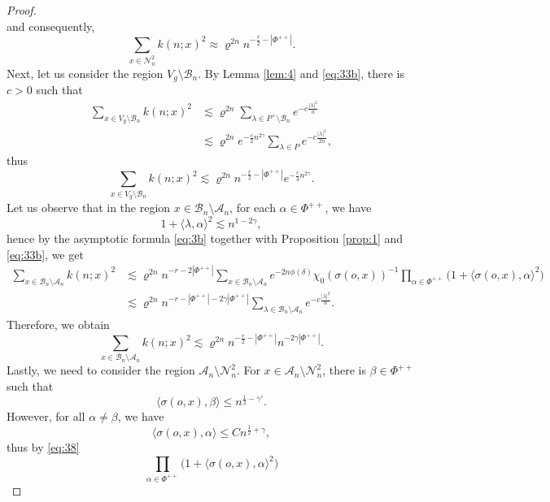 \documentclass[10pt,a4paper]{amsart}
\newcommand{\calA}{\mathcal{A}}
\newcommand{\calB}{\mathcal{B}}
\newcommand{\scrA}{\mathscr{A}}
\newcommand{\scrB}{\mathscr{B}}
\newcommand{\scrN}{\mathscr{N}}
\newcommand{\sprod}[2]{\langle {#1}, {#2} \rangle}
\begin{document}
\begin{proof}
\[	\]
	and consequently,
	\begin{equation}
		\label{eq:34}
		\sum_{x \in \scrN_n^2} k(n; x)^2 \approx \varrho^{2n} n^{-\frac{r}{2} - |\Phi^{++}|}.
	\end{equation}
	Next, let us consider the region $V_g \setminus \scrB_n$. By Lemma \ref{lem:4} and \eqref{eq:33b}, there is $c > 0$ 
	such that 
	\begin{align*}
		\sum_{x \in V_g \setminus \scrB_n}
		k(n; x)^2 
		&\lesssim 
		\varrho^{2n} 
		\sum_{\lambda \in P^+ \setminus \calB_n} e^{-c \frac{|\lambda|^2}{n}} \\
		&\lesssim
		\varrho^{2n}
		e^{-\frac{c}{2} n^{2\gamma}} \sum_{\lambda \in P} e^{-c \frac{|\lambda|^2}{2n}},
	\end{align*}
	thus
	\begin{equation}
		\label{eq:36}
		\sum_{x \in V_g \setminus \scrB_n} k(n; x)^2
		\lesssim \varrho^{2n} n^{-\frac{r}{2} - |\Phi^{++}|} e^{-\frac{c}{4} n^{2\gamma}}.
	\end{equation}
	Let us observe that in the region $x \in \scrB_n \setminus \scrA_n$, for each $\alpha \in \Phi^{++}$, 
	we have
	\[
		1 + \sprod{\lambda}{\alpha}^2 \lesssim n^{1- 2 \gamma}, 
	\]
	hence by the asymptotic formula \eqref{eq:3b} together with Proposition \ref{prop:1} and \eqref{eq:33b}, we get
	\begin{align*}
		\sum_{x \in \scrB_n \setminus \scrA_n} k(n; x)^2
		&\lesssim
		\varrho^{2n} n^{-r - 2 |\Phi^{++}|} 
		\sum_{x \in \scrB_n \setminus \scrA_n}
		e^{-2n \phi(\delta)} \chi_0(\sigma(o, x))^{-1} 
		\prod_{\alpha \in \Phi^{++}} \big(1 + \sprod{\sigma(o, x)}{\alpha}^2\big) \\
		&\lesssim
		\varrho^{2n} n^{-r -|\Phi^{++}|-2 \gamma|\Phi^{++}|}
		\sum_{\lambda \in \calB_n \setminus \calA_n} e^{-c \frac{|\lambda|^2}{n}}.
	\end{align*}
	Therefore, we obtain
	\begin{equation}
		\label{eq:37}
		\sum_{x \in \scrB_n \setminus \scrA_n} k(n; x)^2
		\lesssim
		\varrho^{2n} n^{-\frac{r}{2} -|\Phi^{++}|} n^{-2 \gamma|\Phi^{++}|}.
	\end{equation}
	Lastly, we need to consider the region $\scrA_n \setminus \scrN_n^2$. For $x \in \scrA_n \setminus \scrN_n^2$, there
	is $\beta \in \Phi^{++}$ such that
	\[
		\sprod{\sigma(o, x)}{\beta} \leqslant n^{\frac{1}{2}-\gamma'}.
	\]
	However, for all $\alpha \neq \beta$, we have
	\[
		\sprod{\sigma(o, x)}{\alpha} \leqslant C n^{\frac12+\gamma},
	\]
	thus by \eqref{eq:38}
	\[
		\prod_{\alpha \in \Phi^{++}} \big(1 + \sprod{\sigma(o, x)}{\alpha}^2\big)
\]
\end{proof}
\end{document}
